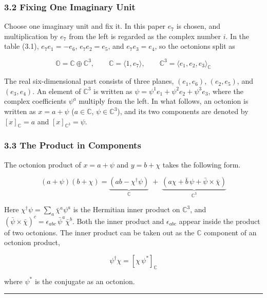 \documentclass[
  a4paper,
]{article}
\begin{document}
\subsubsection{3.2 Fixing One Imaginary
Unit}\label{fixing-one-imaginary-unit}

Choose one imaginary unit and fix it. In this paper \(e_7\) is chosen,
and multiplication by \(e_7\) from the left is regarded as the complex
number \(i\). In the table (3.1), \(e_7e_1 = -e_6\), \(e_7e_2 = e_5\),
and \(e_7e_3 = e_4\), so the octonions split as

\[
\mathbb{O} = \mathbb{C} \oplus \mathbb{C}^3,\qquad
\mathbb{C} = \langle 1, e_7\rangle,\qquad
\mathbb{C}^3 = \langle e_1, e_2, e_3\rangle_{\mathbb C} \tag{3.2}
\]

The real six-dimensional part consists of three planes, \((e_1, e_6)\),
\((e_2, e_5)\), and \((e_3, e_4)\). An element of \(\mathbb{C}^3\) is
written as \(\psi = \psi^1e_1 + \psi^2e_2 + \psi^3e_3\), where the
complex coefficients \(\psi^a\) multiply from the left. In what follows,
an octonion is written as \(x = a + \psi\) (\(a \in \mathbb{C}\),
\(\psi \in \mathbb{C}^3\)), and its two components are denoted by
\([x]_{\mathbb C} = a\) and \([x]_{\mathbb C^3} = \psi\).

\subsubsection{3.3 The Product in
Components}\label{the-product-in-components}

The octonion product of \(x = a + \psi\) and \(y = b + \chi\) takes the
following form.

\[
(a + \psi)(b + \chi) = \underbrace{\left(ab - \chi^\dagger\psi\right)}_{\mathbb{C}}
\;+\; \underbrace{\left(a\chi + \bar b\,\psi + \bar\psi\times\bar\chi\right)}_{\mathbb{C}^3} \tag{3.3}
\]

Here \(\chi^\dagger\psi = \sum_a \bar\chi^a\psi^a\) is the Hermitian
inner product on \(\mathbb{C}^3\), and
\((\bar\psi\times\bar\chi)^c = \epsilon_{abc}\,\bar\psi^a\bar\chi^b\).
Both the inner product and \(\epsilon_{abc}\) appear inside the product
of two octonions. The inner product can be taken out as the
\(\mathbb{C}\) component of an octonion product,

\[
\psi^\dagger\chi = \left[\chi\,\psi^*\right]_{\mathbb C} \tag{3.4}
\]

where \(\psi^*\) is the conjugate as an octonion.

\begin{center}\rule{0.5\linewidth}{0.5pt}\end{center}
\end{document}
